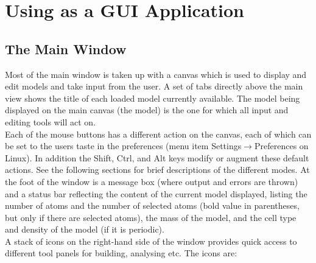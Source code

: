 \chapter{Using as a GUI Application}
\label{sec:gui}

\section{The Main Window}

Most of the main window is taken up with a canvas which is used to display and edit models and take input from the user. A set of tabs directly above the main view shows the title of each loaded model currently available. The model being displayed on the main canvas (the  model) is the one for which all input and editing tools will act on. \\

Each of the mouse buttons has a different action on the canvas, each of which can be set to the users taste in the preferences (menu item Settings$\rightarrow$Preferences on Linux). In addition the Shift, Ctrl, and Alt keys modify or augment these default actions. See the following sections for brief descriptions of the different modes. At the foot of the window is a message box (where output and errors are thrown) and a status bar reflecting the content of the current model displayed, listing the number of atoms and the number of selected atoms (bold value in parentheses, but only if there are selected atoms), the mass of the model, and the cell type and density of the model (if it is periodic).\\

A stack of icons on the right-hand side of the window provides quick access to different tool panels for building, analysing etc. The icons are:\\

